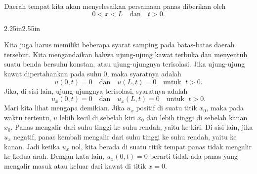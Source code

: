 Daerah tempat kita akan menyelesaikan persamaan panas diberikan oleh 
\begin{equation*}
0 < x < L \quad \text{dan} \quad t > 0 .
\end{equation*}
\begin{mywrapfigsimp}[10]{2.25in}{2.55in}
\noindent
{}
\end{mywrapfigsimp}
Kita juga harus memiliki beberapa syarat samping pada batas-batas daerah tersebut.
Kita mengandaikan bahwa ujung-ujung kawat terbuka 
dan menyentuh suatu benda bersuhu konstan, atau ujung-ujungnya terisolasi.
Jika ujung-ujung kawat dipertahankan pada suhu 0, maka
syaratnya adalah
\begin{equation*}
u(0,t) = 0 \quad \text{dan} \quad u(L,t) = 0
\quad \text{untuk } \; t > 0.
\end{equation*}
Jika, di sisi lain, ujung-ujungnya terisolasi, syaratnya adalah
\begin{equation*}
u_x(0,t) = 0 \quad \text{dan} \quad u_x(L,t) = 0
\quad \text{untuk } \; t > 0 .
\end{equation*}
Mari kita lihat mengapa demikian.
Jika $u_x$ positif di suatu titik $x_0$, maka pada waktu tertentu,
$u$ lebih kecil di sebelah kiri $x_0$ dan lebih tinggi di sebelah kanan $x_0$.
Panas mengalir dari suhu tinggi ke suhu rendah, yaitu ke kiri.
Di sisi lain, jika $u_x$ negatif, panas kembali mengalir
dari suhu tinggi ke suhu rendah,
yaitu ke kanan.  Jadi ketika $u_x$ nol,
kita berada di suatu titik tempat 
panas tidak mengalir ke kedua arah.
Dengan kata lain, $u_x(0,t) = 0$ berarti
tidak ada panas yang mengalir masuk atau keluar dari kawat di titik $x=0$.

